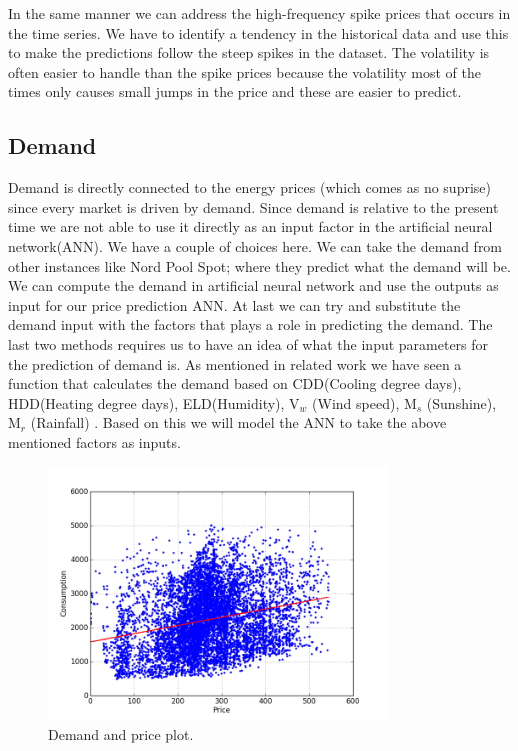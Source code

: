 In the same manner we can address the high-frequency spike prices that occurs in the time series. We have to identify a tendency in the historical data and use this to make the predictions follow the steep spikes in the dataset. The volatility is often easier to handle than the spike prices because the volatility most of the times only causes small jumps in the price and these are easier to predict.

\subsection{Demand}
Demand is directly connected to the energy prices (which comes as no suprise) since every market is driven by demand. Since demand is relative to the present time we are not able to use it directly as an input factor in the artificial neural network(ANN). We have a couple of choices here. We can take the demand from other instances like Nord Pool Spot; where they predict what the demand will be. We can compute the demand in artificial neural network and use the outputs as input for our price prediction ANN. At last we can try and substitute the demand input with the factors that plays a role in predicting the demand. The last two methods requires us to have an idea of what the input parameters for the prediction of demand is. As mentioned in related work we have seen a function that calculates the demand based on CDD(Cooling degree days), HDD(Heating degree days), ELD(Humidity), V$_w$ (Wind speed), M$_s$ (Sunshine), M$_r$ (Rainfall) \cite{19}. Based on this we will model the ANN to take the above mentioned factors as inputs.

\begin{figure}[H]
\centering
\includegraphics[width=0.8\textwidth ]{billeder/energy_price_plots/consump_price.png}
\caption{Demand and price plot.}
\label{fig:consump_price}
\end{figure}

